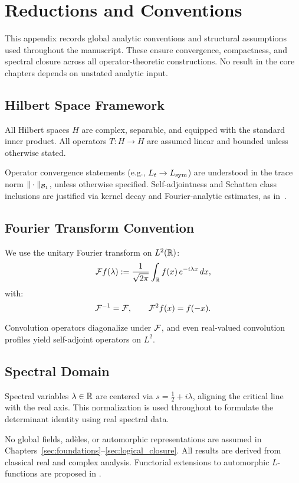 \section{Reductions and Conventions}
\label{app:reductions_and_conventions}

This appendix records global analytic conventions and structural assumptions used throughout the manuscript. These ensure convergence, compactness, and spectral closure across all operator-theoretic constructions. No result in the core chapters depends on unstated analytic input.

\subsection*{Hilbert Space Framework}

All Hilbert spaces \( H \) are complex, separable, and equipped with the standard inner product. All operators \( T \colon H \to H \) are assumed linear and bounded unless otherwise stated.

Operator convergence statements (e.g., \( L_t \to L_{\mathrm{sym}} \)) are understood in the trace norm \( \|\cdot\|_{\mathcal{B}_1} \), unless otherwise specified. Self-adjointness and Schatten class inclusions are justified via kernel decay and Fourier-analytic estimates, as in~\cite{Simon2005TraceIdeals, ReedSimon1980I}.

\subsection*{Fourier Transform Convention}

We use the unitary Fourier transform on \( L^2(\mathbb{R}) \):
\[
\mathcal{F} f(\lambda) := \frac{1}{\sqrt{2\pi}} \int_{\mathbb{R}} f(x)\, e^{-i\lambda x}\, dx,
\]
with:
\[
\mathcal{F}^{-1} = \mathcal{F}, \qquad \mathcal{F}^2 f(x) = f(-x).
\]

Convolution operators diagonalize under \( \mathcal{F} \), and even real-valued convolution profiles yield self-adjoint operators on \( L^2 \).

\subsection*{Spectral Domain}

Spectral variables \( \lambda \in \mathbb{R} \) are centered via \( s = \tfrac{1}{2} + i\lambda \), aligning the critical line with the real axis. This normalization is used throughout to formulate the determinant identity using real spectral data.

No global fields, adèles, or automorphic representations are assumed in Chapters~\ref{sec:foundations}–\ref{sec:logical_closure}. All results are derived from classical real and complex analysis. Functorial extensions to automorphic \( L \)-functions are proposed in .

